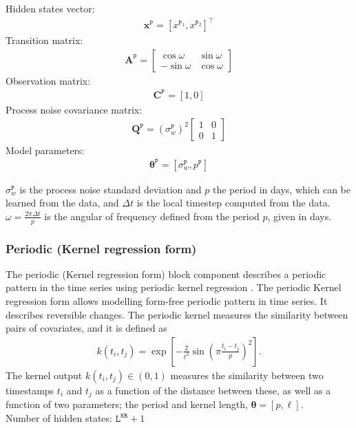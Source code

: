 Hidden states vector: 
\begin{gather*}
\mathbf{x}^{\mathtt{P}} = [x^{\mathtt{P}_ {1}}, x^{\mathtt{P}_{2}}]^{\intercal}
\end{gather*}
Transition matrix: 
\begin{gather*}
\mathbf{A}^{\mathtt{P}}= \left[\begin{array}{cc}\cos \omega &\sin \omega\\-\sin \omega&\cos \omega\end{array}\right]
\end{gather*}
Observation matrix: 
\begin{gather*}
\mathbf{C}^{\mathtt{P}}=[1, 0]
\end{gather*}
Process noise covariance matrix:
\begin{gather*}
\mathbf{Q}^{\mathtt{P}}=(\sigma_{w}^{\mathtt{P}})^{2}\left[\begin{array}{cc}1 &0\\0&1\end{array}\right]
\end{gather*}
Model parameters: 
\begin{gather*}
\bm\theta^{\mathtt{P}}=[\sigma_{w}^{\mathtt{P}}, p^{\mathtt{P}} ]
\end{gather*}

\noindent
$\sigma_{w}^{\mathtt{P}}$ is the process noise standard deviation and $p$ the period in days, which can be learned from the data, and $\Delta t$ is the local timestep computed from the data.
 $\omega=\frac{2\pi \Delta t}{p}$ is the angular of frequency defined from the period $p$, given in days.


\subsubsection{Periodic (Kernel regression form)}\label{SSS:KR}

The periodic (Kernel regression form) block component describes a periodic pattern in the time series using periodic kernel regression  \cite{Nguyen2019KRBDLM}. 
The periodic Kernel regression form allows modelling form-free periodic pattern in time series.
It describes reversible changes.
The periodic kernel measures the similarity between pairs of covariates, and it is defined as
\begin{gather*}
k(t_{i},t_{j})=\exp\left[-\frac{2}{\ell^2}\sin\left( \pi\frac{t_i-t_{j}}{p}\right)^{2}\right].
\end{gather*}
The kernel output $k(t_{i},t_{j})\in(0,1)$ measures the similarity between two timestamps $t_{i}$ and $t_{j}$ as a function of the distance between these, as well as a function of two parameters; the period and kernel length, $\bm{\theta}=[p,\ell]$.
\noindent\\
Number of hidden states:  $\mathtt{L}^{\mathtt{KR}}+1$\\


